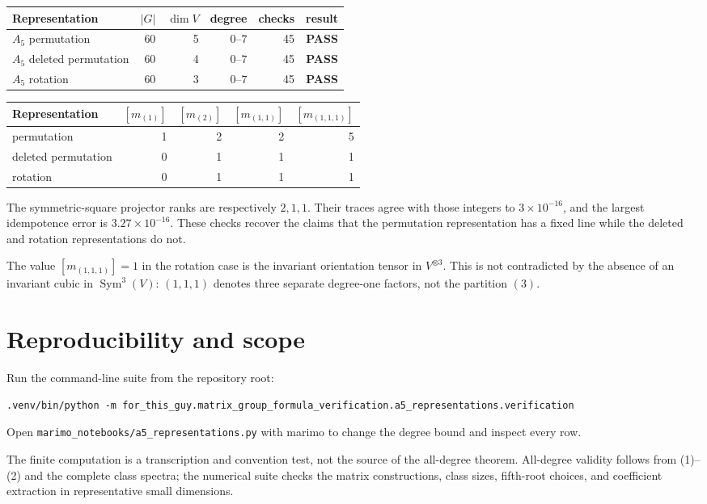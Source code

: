 \documentclass[11pt]{article}
\newcommand{\Sym}{\operatorname{Sym}}
\newcommand{\PASS}{\textcolor{passgreen}{\textbf{PASS}}}
\begin{document}
\begin{center}
\begin{tabularx}{\linewidth}{@{}Xrrrrc@{}}
\toprule
Representation & $|G|$ & $\dim V$ & degree & checks & result\\
\midrule
$A_5$ permutation & 60 & 5 & $0$--$7$ & 45 & \PASS\\
$A_5$ deleted permutation & 60 & 4 & $0$--$7$ & 45 & \PASS\\
$A_5$ rotation & 60 & 3 & $0$--$7$ & 45 & \PASS\\
\bottomrule
\end{tabularx}
\end{center}

\begin{center}
\begin{tabular}{@{}lrrrr@{}}
\toprule
Representation & $[m_{(1)}]$ & $[m_{(2)}]$ & $[m_{(1,1)}]$ & $[m_{(1,1,1)}]$\\
\midrule
permutation & 1 & 2 & 2 & 5\\
deleted permutation & 0 & 1 & 1 & 1\\
rotation & 0 & 1 & 1 & 1\\
\bottomrule
\end{tabular}
\end{center}

The symmetric-square projector ranks are respectively $2,1,1$.  Their traces
agree with those integers to $3\times10^{-16}$, and the largest idempotence
error is $3.27\times10^{-16}$.  These checks recover the claims that the
permutation representation has a fixed line while the deleted and rotation
representations do not.

The value $[m_{(1,1,1)}]=1$ in the rotation case is the invariant orientation
tensor in $V^{\otimes3}$.  This is not contradicted by the absence of an
invariant cubic in $\Sym^3(V)$: $(1,1,1)$ denotes three separate degree-one
factors, not the partition $(3)$.

\section{Reproducibility and scope}

Run the command-line suite from the repository root:
{\scriptsize
\begin{verbatim}
.venv/bin/python -m for_this_guy.matrix_group_formula_verification.a5_representations.verification
\end{verbatim}
}
Open \texttt{marimo\_notebooks/a5\_representations.py} with marimo to change the
degree bound and inspect every row.

The finite computation is a transcription and convention test, not the source
of the all-degree theorem.  All-degree validity follows from (1)--(2) and the
complete class spectra; the numerical suite checks the matrix constructions,
class sizes, fifth-root choices, and coefficient extraction in representative
small dimensions.
\end{document}
